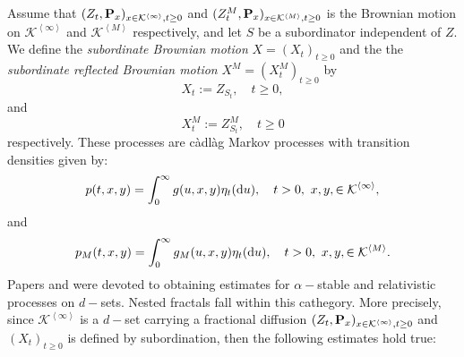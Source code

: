 \documentclass[11pt]{article}
\begin{document}
Assume that $(Z_{t},{\bf P}_{x})_{x \in \mathcal{K}^{\left\langle \infty \right\rangle}, t \geq 0}$ and $(Z^M_{t},{\bf P}_{x})_{x \in \mathcal{K}^{\left\langle M \right\rangle}, t \geq 0}$ is the Brownian motion on $\mathcal{K}^{\left\langle \infty \right\rangle}$ and $\mathcal{K}^{\left\langle M \right\rangle}$ respectively, and let $S$ be a subordinator independent of $Z$. We define the \emph{subordinate Brownian motion} $X = (X_t)_{t \geq 0}$ and the the \emph{subordinate reflected Brownian motion} $X^M = (X^M_t)_{t \geq 0}$ by
$$
X_t := Z_{S_t}, \quad t \geq 0,
$$
and
$$
X^M_t := Z^M_{S_t}, \quad t \geq 0
$$
respectively. These processes are c\`adl\`ag Markov processes with    transition densities given by:
\begin{equation}\label{eq:p_general_subordinated}
p(t,x,y) = \int_0^{\infty} g(u,x,y) \eta_t({\rm d}u), \quad  t>0, \ x,y, \in \mathcal{K}^{\left\langle \infty \right\rangle},
\end{equation}
and
\begin{equation}\label{eq:p_m}
p_M(t,x,y) = \int_0^{\infty} g_M(u,x,y) \eta_t({\rm d}u), \quad  t>0, \ x,y, \in \mathcal{K}^{\left\langle M \right\rangle}.
\end{equation}
Papers \cite{bib:Bal-Kpp} and  \cite{bib:BSS} were devoted to obtaining estimates for $\alpha-$stable and relativistic processes on $d-$sets. Nested fractals fall within this cathegory. More precisely, since $\mathcal{K}^{\left\langle \infty \right\rangle}$ is a $d-$set carrying a fractional diffusion $(Z_{t},{\bf P}_{x})_{x \in \mathcal{K}^{\left\langle \infty \right\rangle}, t \geq 0}$ and $(X_t)_{t \geq 0}$ is defined by subordination, then the following estimates hold true:
\end{document}
